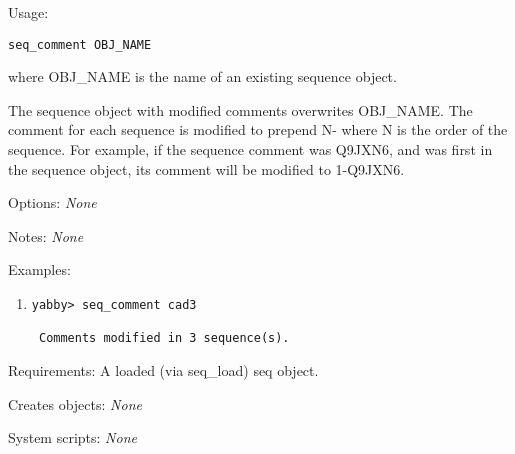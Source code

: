 \begin{description}


\item{Usage:}

{\tt seq\_comment OBJ\_NAME}

where OBJ\_NAME is the name of an existing sequence object.

 The sequence object with modified comments overwrites OBJ\_NAME.
 The comment for each sequence is modified to prepend N- where
 N is the order of the sequence.  For example, if the sequence
 comment was Q9JXN6, and was first in the sequence object, its
 comment will be modified to 1-Q9JXN6.


\item{Options:} {\em None}


\item{Notes:} {\em None}


\item{Examples:}
\begin{enumerate}

\item
\begin{verbatim}
yabby> seq_comment cad3

 Comments modified in 3 sequence(s).
\end{verbatim}

\end{enumerate}


\item{Requirements:} A loaded (via seq\_load) seq object.


\item{Creates objects:} {\em None}


\item{System scripts:} {\em None}

\end{description}



\subsection[seq\_compl]{  }

